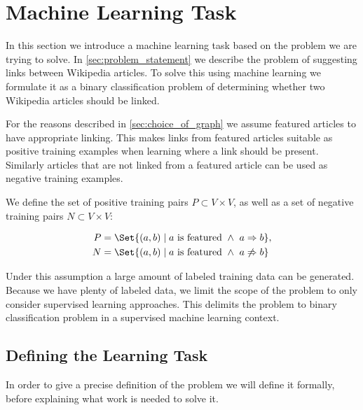 \section{Machine Learning Task}\label{sec:machine_learning_task}
In this section we introduce a machine learning task based on the problem we are trying to solve. In \cref{sec:problem_statement} we describe the problem of suggesting links between Wikipedia articles. To solve this using machine learning we formulate it as a binary classification problem of determining whether two Wikipedia articles should be linked.

For the reasons described in \cref{sec:choice_of_graph} we assume featured articles to have appropriate linking. This makes links from featured articles suitable as positive training examples when learning where a link should be present. Similarly articles that are not linked from a featured article can be used as negative training examples.

We define the set of positive training pairs $P \subset V \times V$, as well as a set of negative training pairs $N \subset V \times V$:

\begin{align*}
P &= \Set{(a,b) \mid a\text{ is featured}\ \wedge\ a \Rightarrow b}, \\
N &= \Set{(a,b) \mid a\text{ is featured}\ \wedge\ a \not\Rightarrow b}
\end{align*}

Under this assumption a large amount of labeled training data can be generated. Because we have plenty of labeled data, we limit the scope of the problem to only consider supervised learning approaches. This delimits the problem to binary classification problem in a supervised machine learning context.


\subsection{Defining the Learning Task}
In order to give a precise definition of the problem we will define it formally, before explaining what work is needed to solve it.


